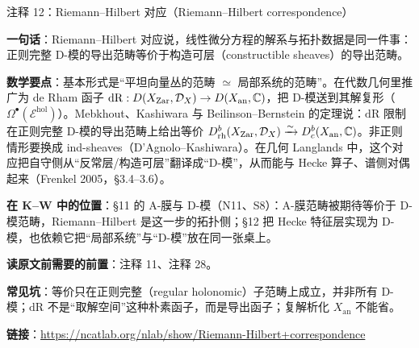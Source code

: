 \begin{kcard}{注释 12：Riemann--Hilbert 对应（Riemann--Hilbert correspondence）}

\textbf{一句话}：Riemann--Hilbert 对应说，线性微分方程的解系与拓扑数据是同一件事：正则完整 D-模的导出范畴等价于构造可层（constructible sheaves）的导出范畴。

\textbf{数学要点}：基本形式是“平坦向量丛的范畴 $\simeq$ 局部系统的范畴”。在代数几何里推广为 de Rham 函子 $\mathrm{dR}:D(X_{\mathrm{Zar}},\mathcal{D}_X)\to D(X_{\mathrm{an}},\mathbb{C})$，把 D-模送到其解复形（$\Omega^\bullet(\mathcal{E}^{\mathrm{hol}})$）。Mebkhout、Kashiwara 与 Beilinson--Bernstein 的定理说：$\mathrm{dR}$ 限制在正则完整 D-模的导出范畴上给出等价 $D^b_{\mathrm{rh}}(X_{\mathrm{Zar}},\mathcal{D}_X)\xrightarrow{\sim}D^b_c(X_{\mathrm{an}},\mathbb{C})$。非正则情形要换成 ind-sheaves（D'Agnolo--Kashiwara）。在几何 Langlands 中，这个对应把自守侧从“反常层/构造可层”翻译成“D-模”，从而能与 Hecke 算子、谱侧对偶起来（Frenkel 2005，§3.4--3.6）。

\textbf{在 K--W 中的位置}：§11 的 A-膜与 D-模（N11、S8）：A-膜范畴被期待等价于 D-模范畴，Riemann--Hilbert 是这一步的拓扑侧；§12 把 Hecke 特征层实现为 D-模，也依赖它把“局部系统”与“D-模”放在同一张桌上。

\textbf{读原文前需要的前置}：注释 11、注释 28。

\textbf{常见坑}：等价只在正则完整（regular holonomic）子范畴上成立，并非所有 D-模；$\mathrm{dR}$ 不是“取解空间”这种朴素函子，而是导出函子；复解析化 $X_{\mathrm{an}}$ 不能省。

\noindent\textbf{链接}：\url{https://ncatlab.org/nlab/show/Riemann-Hilbert+correspondence}
\end{kcard}

